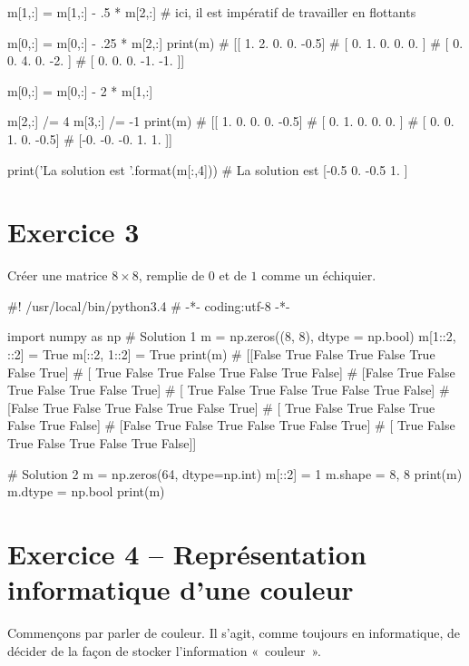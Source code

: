 \documentclass[10pt,fleqn]{article} %
\begin{document}
\begin{multicols}{2}
\begin{corrige}
\begin{python}
m[1,:] = m[1,:] - .5 * m[2,:]
# ici, il est impératif de travailler en flottants

m[0,:] = m[0,:] - .25 * m[2,:]
print(m)
# [[ 1.   2.   0.   0.  -0.5]
#  [ 0.   1.   0.   0.   0. ]
#  [ 0.   0.   4.   0.  -2. ]
#  [ 0.   0.   0.  -1.  -1. ]]

m[0,:] = m[0,:] - 2 * m[1,:]

m[2,:] /= 4
m[3,:] /= -1
print(m)
# [[ 1.   0.   0.   0.  -0.5]
#  [ 0.   1.   0.   0.   0. ]
#  [ 0.   0.   1.   0.  -0.5]
#  [-0.  -0.  -0.   1.   1. ]]

print('La solution est {}'.format(m[:,4]))
# La solution est [-0.5  0.  -0.5  1. ]


\end{python}
\end{corrige}
\else
\fi


\section*{Exercice 3}
Créer une matrice $8\times 8$, remplie de $0$ et de $1$ comme un
échiquier.

\ifprof 
\begin{corrige}
\begin{python}
#! /usr/local/bin/python3.4
# -*- coding:utf-8 -*-
    
import numpy as np
# Solution 1
m = np.zeros((8, 8), dtype = np.bool)
m[1::2, ::2] = True
m[::2, 1::2] = True
print(m)
# [[False  True False  True False  True False  True]
#  [ True False  True False  True False  True False]
#  [False  True False  True False  True False  True]
#  [ True False  True False  True False  True False]
#  [False  True False  True False  True False  True]
#  [ True False  True False  True False  True False]
#  [False  True False  True False  True False  True]
#  [ True False  True False  True False  True False]]


# Solution 2
m = np.zeros(64, dtype=np.int)
m[::2] = 1
m.shape = 8, 8
print(m)
m.dtype = np.bool
print(m)
\end{python}
\end{corrige}
\else
\fi

\newpage


\section*{Exercice 4 -- Représentation informatique d'une couleur}
\ifprof
\else
Commençons par parler de couleur. Il s'agit, comme toujours en
informatique, de décider de la façon de stocker l'information
«~couleur~».


\end{multicols}
\end{document}
